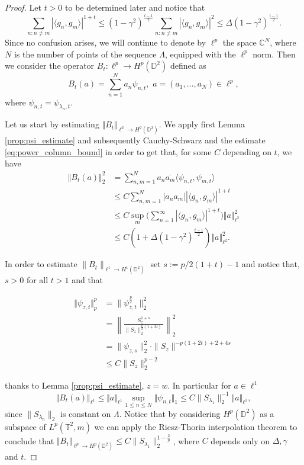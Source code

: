 \documentclass{amsart}
\numberwithin{equation}{section}
\begin{document}
\begin{proof}
 Let $t>0$ to be determined later and notice that 
 \begin{equation}\label{eq:power_column_bound}
		\sum_{n:n\neq m} | \langle g_n, g_m \rangle|^{1+t} \leq (1-\gamma^2)^{\frac{t-1}{2}}\sum_{n:n\neq m} | \langle g_n, g_m \rangle|^2 \leq \Delta (1-\gamma^2)^{\frac{t-1}{2}}.  
	\end{equation}
	Since no confusion arises, we will continue to denote by $\ell^p$ the space $\mathbb{C}^N$, where $N$ is the number of points of the sequence $\Lambda$, equipped with the $\ell^p$ norm. 
	Then we consider the operator $B_t:\ell^p \to H^p(\mathbb{D}^2)	$ defined as 
	\[ B_t(a) = \sum_{n=1}^{N} a_n \psi_{n,t}, \,\, a=(a_1,\dots,a_N)\in \ell^p,  \]
where $ \psi_{n,t}= \psi_{\lambda_n,t}.$ 

Let us start by estimating $\Vert B_t\Vert_{\ell^2 \to H^2(\mathbb{D}^2)} $. We apply first Lemma \ref{prop:psi_estimate} and subsequently Cauchy-Schwarz and the estimate \eqref{eq:power_column_bound} in order to get that, for some $C$ depending on $t$, we have 
\begin{align*} \Vert B_t(a)\Vert^2_{2}  & = \sum_{n,m=1}^N a_n \overline{a_m} \langle \psi_{n,t}, \psi_{m,t} \rangle \\
	& \leq C \sum_{n,m=1}^N |a_n a_m| |\langle g_n, g_m \rangle|^{1+t} \\
	& \leq C \sup_{m} \Big( \sum_{n=1}^{\infty} | \langle g_n, g_m \rangle|^{1+t} \Big)  \Vert a\Vert_{\ell^2}^2 \\ 
	& \leq C(1+\Delta (1-\gamma^2)^{\frac{t-1}{2}}) \Vert a\Vert_{\ell^2}^2.
 \end{align*}

 In order to estimate  $\| B_t\|_{\ell^1 \to H^1(\mathbb{D}^2)}$ set $s:=p/2(1+t)-1$ and notice that, $s>0$ for all $t>1$ and that


\begin{equation}
\begin{split}
\label{eq:pnorm_psit}\Vert \psi_{z,t} \Vert_p^p  &=\|\psi_{z, t}^\frac{p}{2}\|^2_2\\
&=\left\|\frac{S_z^{1+s}}{\|S_z\|_2^{\frac{p}{2}(1+2t)}}\right\|_2^2\\
&=\|\psi_{z, s}\|^2_2\cdot\|S_z\|^{-p(1+2t)+2+4s}\\
&\leq C\|S_z\|_2^{p-2}
\end{split}
\end{equation}

thanks to Lemma \ref{prop:psi_estimate}, $z=w$. In particular for $a\in \ell^1$
\[ \Vert B_t(a)\Vert_{\ell^1} \leq \Vert a\Vert_{\ell^1} \sup_{1\leq n \leq N} \Vert \psi_{n,t}\Vert_{1}  \leq C \|S_{\lambda_1}\|^{-1}_2 \Vert a\Vert_{\ell^1},  \]
since $\|S_{\lambda_n}\|_2$ is constant on $\Lambda$. Notice that by considering $H^p(\mathbb{D}^2)$ as a subspace of $L^p(\mathbb{T}^2,m)$ we can apply the Riesz-Thorin interpolation theorem to conclude that $\Vert B_t\Vert_{\ell^p \to H^p(\mathbb{D}^2)} \leq C\|S_{\lambda_1}\|_2^{1-\frac{2}{p}}$, where $C$ depends only on $\Delta, \gamma$ and $t.$   


\end{proof}
\end{document}
